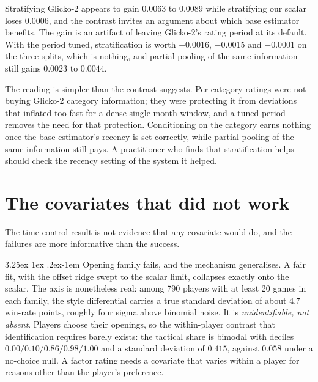 \documentclass[11pt]{article}
\makeatletter
\renewcommand\paragraph{\@startsection{paragraph}{4}{\z@}%
  {3.25ex \@plus1ex \@minus.2ex}{-1em}%
  {\normalfont\normalsize\itshape}}
\makeatother
\begin{document}
Stratifying Glicko-2 appears to gain $0.0063$ to $0.0089$ while
stratifying our scalar loses $0.0006$, and the contrast invites an
argument about which base estimator benefits. The gain is an artifact
of leaving Glicko-2's rating period at its default. With the period
tuned, stratification is worth $-0.0016$, $-0.0015$ and
$-0.0001$ on the three splits, which is nothing, and partial pooling
of the same information still gains $0.0023$ to $0.0044$.

The reading is simpler than the contrast suggests. Per-category
ratings were not buying Glicko-2 category information; they were
protecting it from deviations that inflated too fast for a dense
single-month window, and a tuned period removes the need for that
protection. Conditioning on the category earns nothing once the base
estimator's recency is set correctly, while partial pooling of the same
information still pays. A practitioner who finds that stratification
helps should check the recency setting of the system it helped.

\section{The covariates that did not work}

The time-control result is not evidence that any covariate would do,
and the failures are more informative than the success.

\paragraph{Opening family fails, and the mechanism generalises.} A fair
fit, with the offset ridge swept to the scalar limit, collapses exactly
onto the scalar. The axis is nonetheless real: among 790 players with at
least 20 games in each family, the style differential carries a true
standard deviation of about 4.7 win-rate points, roughly four sigma
above binomial noise. It is \emph{unidentifiable, not absent}. Players
choose their openings, so the within-player contrast that
identification requires barely exists: the tactical share is bimodal
with deciles $0.00/0.10/0.86/0.98/1.00$ and a standard deviation of
$0.415$, against $0.058$ under a no-choice null. A factor rating needs
a covariate that varies within a player for reasons other than the
player's preference.
\end{document}
